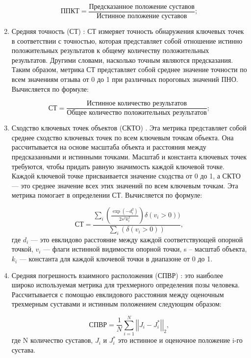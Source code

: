 \begin{enumerate}[label=\arabic*)]
	\begin{equation}
		\text{ППКТ} = \frac{\text{Предсказанное положение суставов}}{\text{Истинное положение суставов}};
	\end{equation}
	
	\item Средняя точность (СТ) \cite{guide-hpe}: СТ измеряет точность обнаружения ключевых точек в соответствии с точностью, которая представляет собой отношение истинно положительных результатов к общему количеству положительных результатов.
	Другими словами, насколько точным являются предсказания. 
	Таким образом, метрика СТ представляет собой среднее значение точности по всем значениям отзыва от 0 до 1 при различных пороговых значений ПНО.
	Вычисляется по формуле:
	
	\begin{equation}
		\text{СТ} = \frac{\text{Истинное количество результатов}}{\text{Общее количество положительных результатов}};
	\end{equation}
	
	\item Сходство ключевых точек объектов (СКТО) \cite{COCO}. Эта метрика представляет собой среднее сходство ключевых точек по всем ключевым точкам объекта.
	Она рассчитывается на основе масштаба объекта и расстояния между предсказанными и истинными точками.
	Масштаб и константа ключевых точек требуются, чтобы придать равную значимость каждой ключевой точке.
	Каждой ключевой точке присваивается значение сходства от 0 до 1, а СКТО --- это среднее значение всех этих значений по всем ключевым точкам.
	Эта метрика помогает в определении СТ.
	Вычисляется по формуле:
	
	\begin{equation}
		\text{СТ} = \frac{\sum_i(\frac{\exp(-d_i^2)}{2s^2k_i^2})\delta(v_i>0))}{\sum_i(\delta(v_i > 0))},
	\end{equation}
	где $d_i$ --- это евклидово расстояние между каждой соответствующей опорной точкой, $v_i$ --- флаги истинной видимости опорной точки, s -- масштаб объекта, $k_i$ --- константа для каждой ключевой точки в диапазоне от 0 до 1.  
	\item Средняя погрешность взаимного расположения (СПВР) \cite{COCO}: это наиболее широко используемая метрика для трехмерного определения позы человека.
	Рассчитывается с помощью евклидового расстояния между оценочным трехмерным суставами и истинным положением следующим образом:
	
	\begin{equation}
		\text{СПВР} = \frac{1}{N}\sum_{i=1}^{N} \left| \left| J_i -J_i^*\right| \right|_2,
	\end{equation}
	где N количество суставов, $J_i$ и $J_i^*$ это истинное и оценочное положение i-го сустава.
\end{enumerate}

